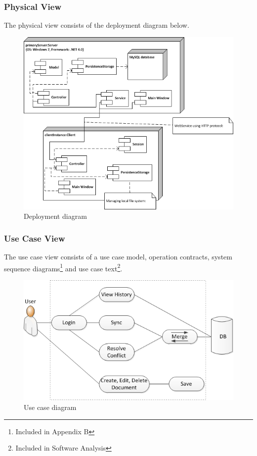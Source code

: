 \documentclass[a4paper,11pt,report]{report}
\begin{document}
\subsubsection{Physical View}
The physical view consists of the deployment diagram below.
\begin{figure}[H]
  \centering
\includegraphics[]{./deploymentview}
\caption{Deployment diagram}
\end{figure}
\newpage
\subsubsection{Use Case View}
The use case view consists of a use case model, operation contracts, system sequence diagrams\footnote[10]{Included in Appendix B} and use case text\footnote[11]{Included in Software Analysis}.
\begin{figure}[H]
  \centering
\includegraphics[]{./UseCaseDiagram}
\caption{Use case diagram}
\end{figure}
\end{document}
